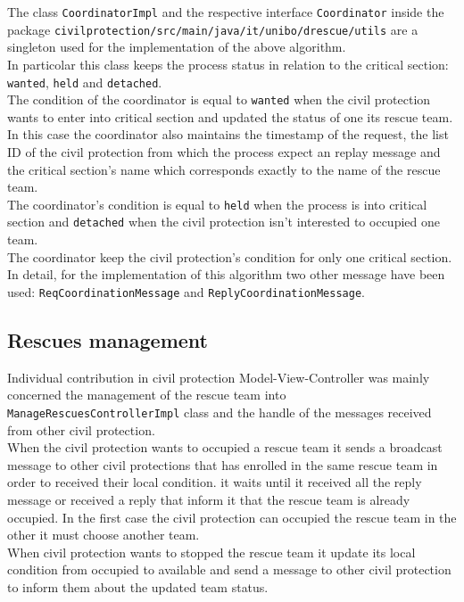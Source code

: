 \documentclass[a4paper,12pt]{report}
\begin{document}
The class \texttt{CoordinatorImpl} and the respective interface \texttt{Coordinator} inside the package \texttt{civilprotection/src/main/java/it/unibo/drescue/utils} are a singleton used for the implementation of the above algorithm.\\
In particolar this class keeps the process status in relation to the critical section: \texttt{wanted}, \texttt{held} and \texttt{detached}.\\
The condition of the coordinator is equal to \texttt{wanted} when the civil protection wants to enter into critical section and updated the status of one  its rescue team. 
In this case the coordinator also maintains the timestamp of the request, the list ID of the civil protection from which the process expect an replay message and the critical section's name which corresponds exactly to the name of the rescue team.\\
The coordinator's condition is equal to \texttt{held} when the process is into critical section and \texttt{detached} when the civil protection isn't interested to occupied one team.\\
The coordinator keep the civil protection's condition for only one critical section.\\
In detail, for the implementation of this algorithm two other message have been used:
\texttt{ReqCoordinationMessage} and \texttt{ReplyCoordinationMessage}.  

\subsection{Rescues management}
Individual contribution in civil protection Model-View-Controller was mainly concerned the management of the rescue team into \texttt{ManageRescuesControllerImpl} class and the handle of the  messages received from other civil protection.\\
When the civil protection wants to occupied a rescue team it sends a  broadcast message to other civil protections that has enrolled in the same rescue team in order to received their local condition.
it waits until it received all the reply message or received a reply that inform it that the rescue team is already occupied.
In the first case the civil protection can occupied the rescue team in the other it must choose another team.\\
When civil protection wants to stopped the rescue team it update its local  condition from occupied to available and send a message to other civil protection to inform them about the updated team status.\\
\end{document}
